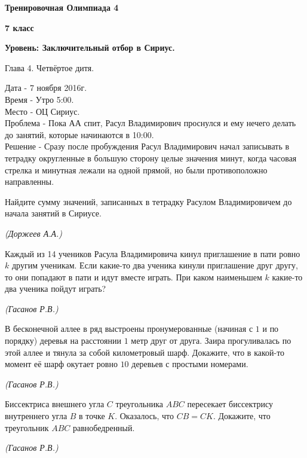 \centerline{\Huge \bf  Тренировочная Олимпиада 4}
\centerline{\Huge \bf 7 класс}
\centerline{\Huge \bf Уровень: Заключительный отбор в Сириус.}


\begin{flushright}
    \scriptsize{Глава 4. Четвёртое дитя.}
\end{flushright}

Дата - 7 ноября 2016г.\\
Время - Утро 5:00.\\
Место - ОЦ Сириус.\\
Проблема - Пока АА спит, Расул Владимирович проснулся и ему нечего делать до занятий, которые начинаются в 10:00.\\
Решение - Сразу после пробуждения Расул Владимирович начал записывать в тетрадку округленные в большую сторону целые значения минут, когда часовая стрелка и минутная лежали на одной прямой, но были противоположно направленны.

Найдите сумму значений, записанных в тетрадку Расулом Владимировичем до начала занятий в Сириусе.
\begin{flushright}
    \textit{\small{(Доржеев А.А.)}}
\end{flushright}

Каждый из 14 учеников Расула Владимировича кинул приглашение в пати ровно $k$ другим ученикам. Если какие-то два ученика кинули приглашение друг другу, то они попадают в пати и идут вместе играть. При каком наименьшем $k$ какие-то два ученика пойдут играть?
\begin{flushright} 
    \textit{\small{(Гасанов Р.В.)}}
\end{flushright}

В бесконечной аллее в ряд выстроены пронумерованные (начиная с $1$ и по порядку) деревья на расстоянии $1$ метр друг от друга. Заира прогуливалась по этой аллее и тянула за собой километровый шарф. Докажите, что в какой-то момент её шарф окутает ровно $10$ деревьев с простыми номерами.

\begin{flushright}
    \textit{\small{(Гасанов Р.В.)}}
\end{flushright}

Биссектриса внешнего угла $C$ треугольника $ABC$ пересекает биссектрису внутреннего угла $B$ в точке $K$. Оказалось, что $CB = CK$. Докажите, что треугольник $ABC$ равнобедренный.
\begin{flushright}
    \textit{\small{(Гасанов Р.В.)}}
\end{flushright}

